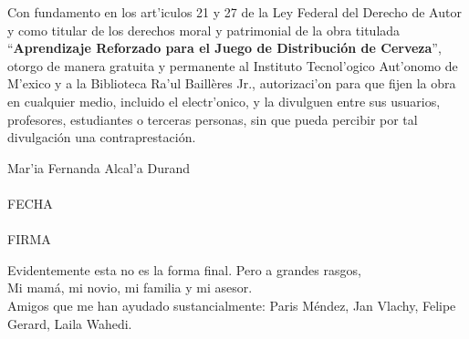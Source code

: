 
\newpage
\mbox{}
\thispagestyle{empty} %

\newpage
\thispagestyle{empty}
Con fundamento en los art'iculos 21 y 27 de la Ley Federal del
Derecho de Autor y como titular de los derechos moral y patrimonial de la obra titulada ``\textbf{Aprendizaje Reforzado para el Juego de Distribuci\'on de Cerveza}'', otorgo de manera gratuita y permanente al Instituto Tecnol'ogico Aut'onomo de M'exico y a la Biblioteca Ra'ul Baill\`eres Jr., autorizaci'on para que fijen la obra en cualquier medio, incluido el electr'onico, y la divulguen entre sus usuarios, profesores, estudiantes o terceras personas, sin que pueda percibir por tal divulgación una contraprestación.

\vspace{20 mm}
\begin{center}
Mar'ia Fernanda Alcal'a Durand\\

\vspace{20 mm}
\makebox[2in]{\hrulefill}\\
FECHA\\
\vspace{20 mm}
\makebox[2in]{\hrulefill}\\
FIRMA
\end{center}

\newpage
\mbox{}
\thispagestyle{empty} %



Evidentemente esta no es la forma final. Pero a grandes rasgos, \\

Mi mam\'a, mi novio, mi familia y mi asesor.\\

Amigos que me han ayudado sustancialmente: Paris M\'endez, Jan Vlachy, Felipe Gerard, Laila Wahedi.

\newpage
\mbox{}
\thispagestyle{empty} %
